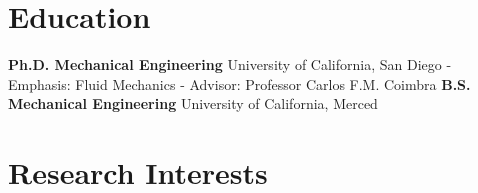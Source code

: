 \documentclass[11pt,a4paper]{moderncv}
\begin{document}
\maketitle


\section{\textbf{Education}}
	{\textbf{Ph.D. Mechanical Engineering}}
	{}{University of California, San Diego}{}
	{
	- Emphasis: Fluid Mechanics \newline
	- Advisor: Professor Carlos F.M. Coimbra
	}
	{\textbf{B.S. Mechanical Engineering}}
	{}{University of California, Merced}{}
	{}


\section{\textbf{Research Interests}}



\end{document}
